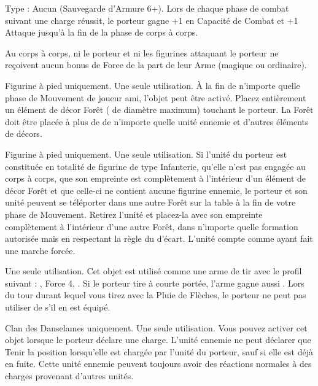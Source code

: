 \startpricelist

Type : Aucun (Sauvegarde d'Armure 6+). Lors de chaque phase de combat suivant une charge réussit, le porteur gagne +1 en Capacité de Combat et +1 Attaque jusqu'à la fin de la phase de corps à corps.

\endpricelist

\armytalismans

\startpricelist

Au corps à corps, ni le porteur et ni les figurines attaquant le porteur ne reçoivent aucun bonus de Force de la part de leur Arme (magique ou ordinaire).

\endpricelist

\armyenchanteditems

\startpricelist

Figurine à pied uniquement. Une seule utilisation. À la fin de n'importe quelle phase de Mouvement de joueur ami, l'objet peut être activé. Placez entièrement un élément de décor Forêt ( de diamètre maximum) touchant le porteur. La Forêt doit être placée à plus de  de n'importe quelle unité ennemie et d'autres éléments de décors.

Figurine à pied uniquement. Une seule utilisation. Si l'unité du porteur est constituée en totalité de figurine de type Infanterie, qu'elle n'est pas engagée au corps à corps, que son empreinte est complètement à l'intérieur d'un élément de décor Forêt et que celle-ci ne contient aucune figurine ennemie, le porteur et son unité peuvent se téléporter dans une autre Forêt sur la table à la fin de votre phase de Mouvement. Retirez l'unité et placez-la avec son empreinte complètement à l'intérieur d'une autre Forêt, dans n'importe quelle formation autorisée mais en respectant la règle du  d'écart. L'unité compte comme ayant fait une marche forcée.

Une seule utilisation. Cet objet est utilisé comme une arme de tir avec le profil suivant : , Force 4, . Si le porteur tire à courte portée, l'arme gagne aussi . Lors du tour durant lequel vous tirez avec la Pluie de Flèches, le porteur ne peut pas utiliser de \feyarrows{} s'il en est équipé.

Clan des Danselames uniquement. Une seule utilisation. Vous pouvez activer cet objet lorsque le porteur déclare une charge. L'unité ennemie ne peut déclarer que Tenir la position lorsqu'elle est chargée par l'unité du porteur, sauf si elle est déjà en fuite. Cette unité ennemie peuvent toujours avoir des réactions normales à des charges provenant d'autres unités.

